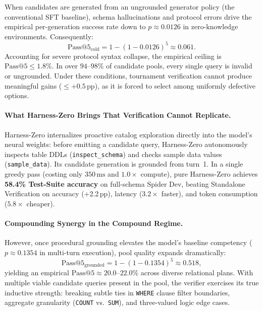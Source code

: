 \documentclass{article}
\theoremstyle{plain}
\theoremstyle{definition}
\theoremstyle{remark}
\begin{document}
When candidates are generated from an ungrounded generator policy (the conventional SFT baseline), schema hallucinations and protocol errors drive the empirical per-generation success rate down to $p \approx 0.0126$ in zero-knowledge environments. Consequently:
\begin{equation}
    \text{Pass@5}_{\text{cold}} = 1 - (1 - 0.0126)^5 \approx 0.061.
\end{equation}
Accounting for severe protocol syntax collapse, the empirical ceiling is $\text{Pass@5} \le 1.8\%$. In over $94\text{--}98\%$ of candidate pools, every single query is invalid or ungrounded. Under these conditions, tournament verification cannot produce meaningful gains ($\le +0.5\,\text{pp}$), as it is forced to select among uniformly defective options.

\paragraph{What Harness-Zero Brings That Verification Cannot Replicate.}
Harness-Zero internalizes proactive catalog exploration directly into the model's neural weights: before emitting a candidate query, Harness-Zero autonomously inspects table DDLs (\texttt{inspect\_schema}) and checks sample data values (\texttt{sample\_data}). Its candidate generation is grounded from turn~1. In a single greedy pass (costing only $350\,\text{ms}$ and $1.0\times$ compute), pure Harness-Zero achieves \textbf{58.4\% Test-Suite accuracy} on full-schema Spider Dev, beating Standalone Verification on accuracy (+2.2\,pp), latency ($3.2\times$ faster), and token consumption ($5.8\times$ cheaper).

\paragraph{Compounding Synergy in the Compound Regime.}
However, once procedural grounding elevates the model's baseline competency ($p \approx 0.1354$ in multi-turn execution), pool quality expands dramatically:
\begin{equation}
    \text{Pass@5}_{\text{grounded}} = 1 - (1 - 0.1354)^5 \approx 0.518,
\end{equation}
yielding an empirical $\text{Pass@5} \approx 20.0\text{--}22.0\%$ across diverse relational plans. With multiple viable candidate queries present in the pool, the verifier exercises its true inductive strength: breaking subtle ties in \texttt{WHERE} clause filter boundaries, aggregate granularity (\texttt{COUNT} vs.\ \texttt{SUM}), and three-valued logic edge cases.
\end{document}
